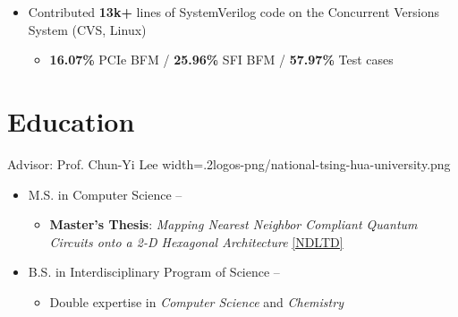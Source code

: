 \documentclass{cvclass}
\newcommand{\simplemmyy}[3]{\shortmmyyformat\formatdate{#3}{#2}{#1}}
\begin{document}
{\begin{itemize}
        \begin{itemize}
            \item {\textbf{67.33\%} Customer Issues / \textbf{27.56\%} Product Enhancements}
        \end{itemize}
        \item Contributed \textbf{13k+} lines of SystemVerilog code on the Concurrent Versions System (CVS, Linux)
        \begin{itemize}
            \item \textbf{16.07\%} PCIe BFM / \textbf{25.96\%} SFI BFM / \textbf{57.97\%} Test cases
        \end{itemize}
    \end{itemize}}


\section{Education}

        {Advisor: Prof. Chun-Yi Lee}
        {width=.2\linewidth}{logos-png/national-tsing-hua-university.png}{
    \begin{itemize}
        \item M.S. in Computer Science -- \textit{\simplemmyy{2021}{6}{30}} %
        \begin{itemize}
            \item \textbf{Master’s Thesis}: \textit{Mapping Nearest Neighbor Compliant Quantum Circuits onto a 2-D Hexagonal Architecture} \href{https://hdl.handle.net/11296/dpttkc}{[NDLTD]}
        \end{itemize}
        \item B.S. in Interdisciplinary Program of Science -- \textit{\simplemmyy{2017}{6}{30}} %
        \begin{itemize}
            \item Double expertise in \textit{Computer Science} and \textit{Chemistry}
        \end{itemize}
    \end{itemize}}


\makepublications
\end{document}

